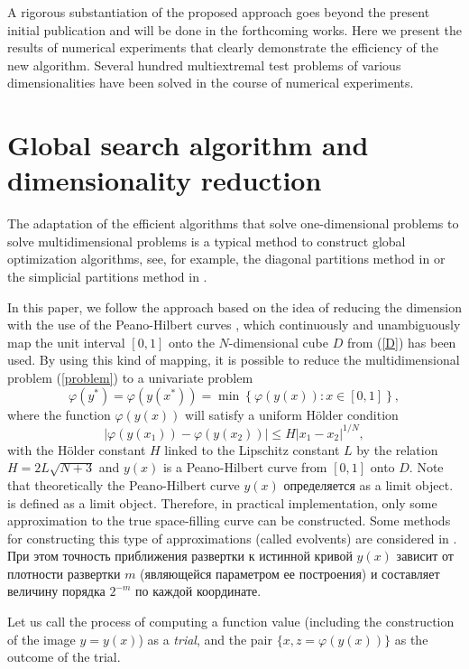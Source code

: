 \documentclass[runningheads]{llncs}
\begin{document}
A rigorous substantiation of the proposed approach goes beyond the present initial publication and will be done in the forthcoming works. Here we present the results of numerical experiments that clearly demonstrate the efficiency of the new algorithm. Several hundred multiextremal test problems of various dimensionalities have been solved in the course of numerical experiments.

\section{Global search algorithm and dimensionality reduction}

The adaptation of the efficient algorithms that solve one-dimensional problems to solve multidimensional problems is a typical method to construct global optimization algorithms, see, for example, the diagonal partitions method in \cite{Sergeyev2006} or the simplicial partitions method in \cite{Zilinskas2008}.

In this paper, we follow the approach based on the idea of reducing the dimension with the use of the Peano-Hilbert curves \cite{Sergeyev2013,Strongin2000}, which continuously and unambiguously map the unit interval $[0,1]$ onto the $N$-dimensional cube $D$ from (\ref{D}) has been used. By using this kind of mapping, it is possible to reduce the multidimensional problem (\ref{problem}) to a univariate problem
\[
\varphi(y^\ast)=\varphi(y(x^\ast))=\min{\left\{\varphi(y(x)): x\in[0,1]\right\}},
\]
where the function $\varphi(y(x))$ will satisfy a uniform H{\"o}lder condition
\[
\left|\varphi(y(x_1))-\varphi(y(x_2))\right|\leq H\left|x_1-x_2\right|^{1/N},
\]
with the H{\"o}lder constant $H$ linked to the Lipschitz constant $L$ by the relation
$ H=2 L \sqrt{N+3}$ and $y(x)$ is a Peano-Hilbert curve from $[0,1]$ onto $D$.
Note that theoretically the Peano-Hilbert curve $y(x)$ определяется as a limit object. is defined as a limit object. Therefore, in practical implementation, only some approximation to the true space-filling curve can be constructed. Some methods for constructing this type of approximations (called evolvents) are considered in \cite{Sergeyev2013,Strongin2000}. При этом точность приближения развертки к истинной кривой $y(x)$ зависит от плотности развертки $m$ (являющейся параметром ее построения) и составляет величину порядка $2^{-m}$ по каждой координате.

Let us call the process of computing a function value (including the construction of the image $y=y(x)$) as a \textit{trial}, and the pair $\{x, z = \varphi(y(x))\}$ as the outcome of the trial.
\end{document}
